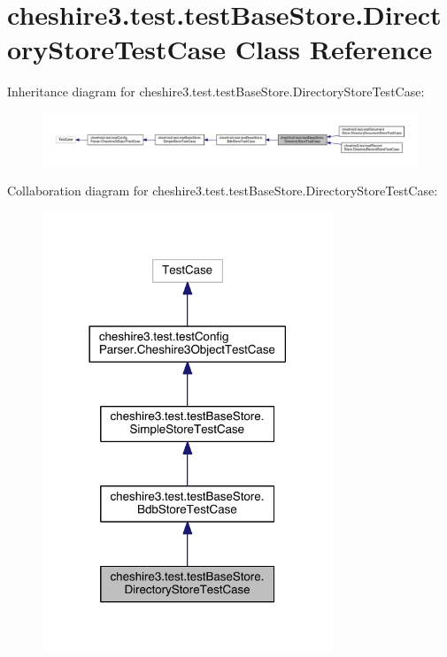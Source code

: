 \hypertarget{classcheshire3_1_1test_1_1test_base_store_1_1_directory_store_test_case}{\section{cheshire3.\-test.\-test\-Base\-Store.\-Directory\-Store\-Test\-Case Class Reference}
\label{classcheshire3_1_1test_1_1test_base_store_1_1_directory_store_test_case}
}


Inheritance diagram for cheshire3.\-test.\-test\-Base\-Store.\-Directory\-Store\-Test\-Case\-:
\nopagebreak
\begin{figure}[H]
\begin{center}
\leavevmode
\includegraphics[width=350pt]{classcheshire3_1_1test_1_1test_base_store_1_1_directory_store_test_case__inherit__graph}
\end{center}
\end{figure}


Collaboration diagram for cheshire3.\-test.\-test\-Base\-Store.\-Directory\-Store\-Test\-Case\-:
\nopagebreak
\begin{figure}[H]
\begin{center}
\leavevmode
\includegraphics[width=246pt]{classcheshire3_1_1test_1_1test_base_store_1_1_directory_store_test_case__coll__graph}
\end{center}
\end{figure}
